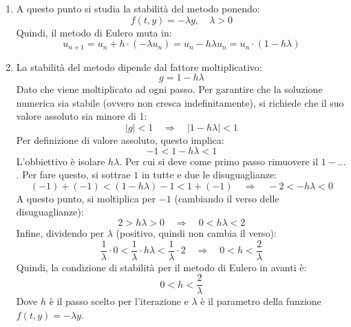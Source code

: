 \begin{itemize}
\begin{enumerate}
        \item A questo punto si studia la stabilità del metodo ponendo:
        \begin{equation*}
            f(t, y) = -\lambda y, \quad \lambda > 0
        \end{equation*}
        Quindi, il metodo di Eulero muta in:
        \begin{equation*}
            u_{n+1} = u_{n} + h \cdot \left(-\lambda u_{n}\right) = u_{n} - h\lambda u_{n} = u_{n} \cdot \left(1 - h\lambda\right)
        \end{equation*}

        \item La stabilità del metodo dipende dal fattore moltiplicativo:
        \begin{equation*}
            g = 1 - h\lambda
        \end{equation*}
        Dato che viene moltiplicato ad ogni passo. Per garantire che la soluzione numerica sia stabile (ovvero non cresca indefinitamente), si richiede che il suo valore assoluto sia minore di 1:
        \begin{equation*}
            |g| < 1 \quad \Rightarrow \quad |1 - h\lambda| < 1
        \end{equation*}
        Per definizione di valore assoluto, questo implica:
        \begin{equation*}
            -1 < 1 - h\lambda < 1
        \end{equation*}
        L'obbiettivo è isolare $h \lambda$. Per cui si deve come primo passo rimuovere il $1 - \dots$. Per fare questo, si sottrae $1$ in tutte e due le disuguaglianze:
        \begin{equation*}
            \left(-1\right) + \left(-1\right) < \left(1 - h\lambda\right) - 1 < 1 + \left(- 1\right) \quad \Rightarrow \quad -2 < - h\lambda < 0
        \end{equation*}
        A questo punto, si moltiplica per $-1$ (cambiando il verso delle disuguaglianze):
        \begin{equation*}
            2 > h\lambda > 0 \quad \Rightarrow \quad 0 < h\lambda < 2
        \end{equation*}
        Infine, dividendo per $\lambda$ (positivo, quindi non cambia il verso):
        \begin{equation*}
            \dfrac{1}{\lambda} \cdot 0 < \dfrac{1}{\lambda} \cdot h\lambda < \dfrac{1}{\lambda} \cdot 2 \quad \Rightarrow \quad 0 < h < \dfrac{2}{\lambda}
        \end{equation*}
        Quindi, la condizione di stabilità per il metodo di Eulero in avanti è:
        \begin{equation*}
            0 < h < \dfrac{2}{\lambda}
        \end{equation*}
        Dove $h$ è il passo scelto per l'iterazione e $\lambda$ è il parametro della funzione $f(t, y) = -\lambda y$.
    \end{enumerate}



\end{itemize}
